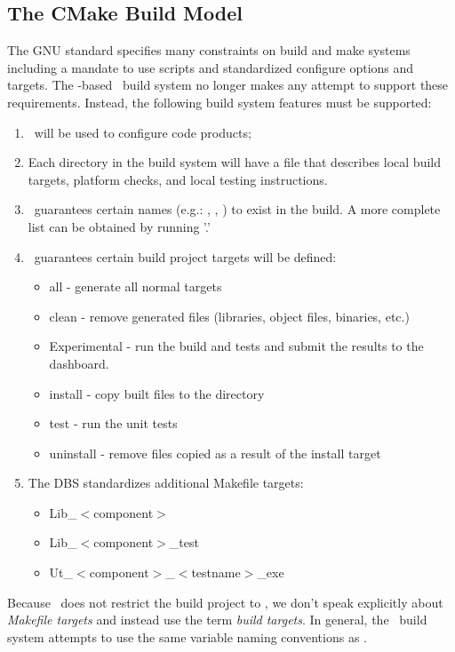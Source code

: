 \subsection{The CMake Build Model}
\label{sec:cmake_build_model}

The GNU standard specifies many constraints on build and make systems including a mandate to use   scripts and standardized configure options and  targets.  The \cmake-based \draco\ build system no longer makes any attempt to support these requirements.  Instead, the following build system features must be supported:
\begin{enumerate}
\item \cmake\ will be used to configure code products;
\item Each directory in the build system will have a  file that describes local build targets, platform checks, and local testing instructions.
\item \cmake\ guarantees certain names (e.g.: , , ) to exist in the build.  A more complete list can be obtained by running '.'
\item \cmake\ guarantees certain build project targets will be defined:
\begin{itemize}
\item all - generate all normal targets
\item clean - remove generated files (libraries, object files, binaries, etc.)
\item Experimental - run the build and tests and submit the results to the dashboard.
\item install - copy built files to the  directory 
\item test -  run the unit tests
\item uninstall - remove files copied as a result of the install target
\end{itemize}
\item The DBS standardizes additional Makefile targets:
\begin{itemize}
\item Lib\_$<$component$>$
\item  Lib\_$<$component$>$\_test
\item Ut\_$<$component$>$\_$<$testname$>$\_exe
\end{itemize}
\end{enumerate}
Because \cmake\ does not restrict the build project to , we don't speak explicitly about {\it Makefile targets} and instead use the term {\it build targets}.  In general, the \draco\ build system attempts to use the same variable naming conventions as \cmake.

